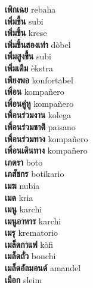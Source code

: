 \textbf{ เพิกเฉย  } rebaha \\
\textbf{ เพิ่มขี้น  } subi \\
\textbf{ เพิ่มขึ้น  } krese \\
\textbf{ เพิ่มขึ้นสองเท่า  } dòbel \\
\textbf{ เพิ่มสูงขึ้น  } subi \\
\textbf{ เพิ่มเติม  } èkstra \\
\textbf{ เพียงพอ  } konfortabel \\
\textbf{ เพื่อน  } kompañero \\
\textbf{ เพื่อนคู่หู  } kompañero \\
\textbf{ เพื่อนร่วมงาน  } kolega \\
\textbf{ เพื่อนร่วมชาติ  } paisano \\
\textbf{ เพื่อนร่วมทาง  } kompañero \\
\textbf{ เพื่อนเดินทาง  } kompañero \\
\textbf{ เภตรา  } boto \\
\textbf{ เภสัชกร  } botikario \\
\textbf{ เมฆ  } nubia \\
\textbf{ เมด  } kria \\
\textbf{ เมนู  } karchi \\
\textbf{ เมนูอาหาร  } karchi \\
\textbf{ เมรุ  } krematorio \\
\textbf{ เมล็ดกาแฟ  } kòfi \\
\textbf{ เมล็ดถั่ว  } bonchi \\
\textbf{ เมล็ดอัลมอนด์  } amandel \\
\textbf{ เมือก  } sleim \\
